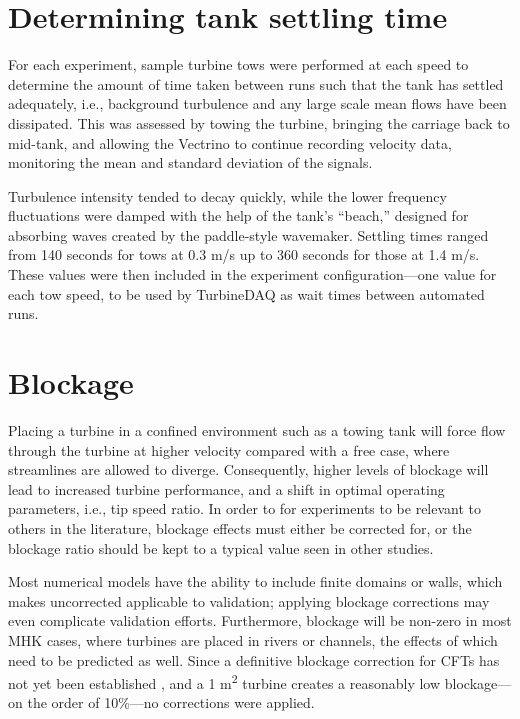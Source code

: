\section{Determining tank settling time}

For each experiment, sample turbine tows were performed at each speed to
determine the amount of time taken between runs such that the tank has settled
adequately, i.e., background turbulence and any large scale mean flows have been
dissipated. This was assessed by towing the turbine, bringing the carriage back
to mid-tank, and allowing the Vectrino to continue recording velocity data,
monitoring the mean and standard deviation of the signals.

Turbulence intensity tended to decay quickly, while the lower frequency
fluctuations were damped with the help of the tank's ``beach,'' designed for
absorbing waves created by the paddle-style wavemaker. Settling times ranged
from 140 seconds for tows at 0.3 m/s up to 360 seconds for those at 1.4 m/s.
These values were then included in the experiment configuration---one value for
each tow speed, to be used by TurbineDAQ as wait times between automated runs.


\section{Blockage}

Placing a turbine in a confined environment such as a towing tank will force
flow through the turbine at higher velocity compared with a free case, where
streamlines are allowed to diverge. Consequently, higher levels of blockage will
lead to increased turbine performance, and a shift in optimal operating
parameters, i.e., tip speed ratio. In order to for experiments to be relevant to
others in the literature, blockage effects must either be corrected for, or the
blockage ratio should be kept to a typical value seen in other studies.

Most numerical models have the ability to include finite domains or walls, which
makes uncorrected applicable to validation; applying blockage corrections may
even complicate validation efforts. Furthermore, blockage will be non-zero in
most MHK cases, where turbines are placed in rivers or channels, the effects of
which need to be predicted as well. Since a definitive blockage correction for
CFTs has not yet been established \cite{Cavagnaro2014, Dossena2015}, and a 1
m\textsuperscript{2} turbine creates a reasonably low blockage---on the order of
10\%---no corrections were applied.

